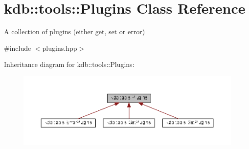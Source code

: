 \hypertarget{classkdb_1_1tools_1_1Plugins}{}\section{kdb\+:\+:tools\+:\+:Plugins Class Reference}
\label{classkdb_1_1tools_1_1Plugins}


A collection of plugins (either get, set or error)  




{\ttfamily \#include $<$plugins.\+hpp$>$}



Inheritance diagram for kdb\+:\+:tools\+:\+:Plugins\+:
\nopagebreak
\begin{figure}[H]
\begin{center}
\leavevmode
\includegraphics[width=350pt]{classkdb_1_1tools_1_1Plugins__inherit__graph}
\end{center}
\end{figure}
